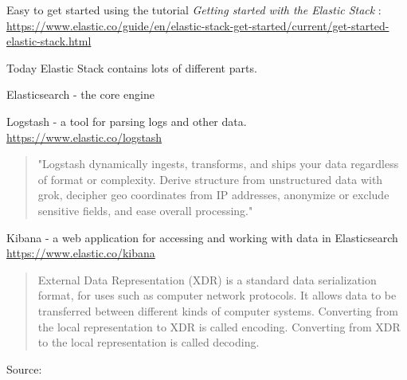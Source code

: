 \documentclass[Screen16to9,17pt]{foils}
\begin{document}

Easy to get started using the tutorial \emph{Getting started with the Elastic Stack} :\\
{\footnotesize\url{https://www.elastic.co/guide/en/elastic-stack-get-started/current/get-started-elastic-stack.html}}

Today Elastic Stack contains lots of different parts.

\begin{list2}
\item Elasticsearch - the core engine
\item Logstash - a tool for parsing logs and other data.\\
\url{https://www.elastic.co/logstash}
\begin{quote}
"Logstash dynamically ingests, transforms, and ships your data regardless of format or complexity. Derive structure from unstructured data with grok, decipher geo coordinates from IP addresses, anonymize or exclude sensitive fields, and ease overall processing."
\end{quote}
\item Kibana - a web application for accessing and working with data in Elasticsearch\\
\url{https://www.elastic.co/kibana}
\end{list2}






\begin{quote}
External Data Representation (XDR) is a standard data serialization format, for uses such as computer network protocols. It allows data to be transferred between different kinds of computer systems. Converting from the local representation to XDR is called encoding. Converting from XDR to the local representation is called decoding.
\end{quote}

Source: {\footnotesize\\
\\ }


\end{document}

